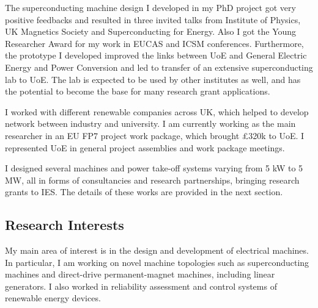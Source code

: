 \documentclass[a4paper,12pt]{article}
\begin{document}
The superconducting machine design I developed in my PhD project got very positive feedbacks and resulted in three invited talks from Institute of Physics, UK Magnetics Society and Superconducting for Energy. Also I got the Young Researcher Award for my work in EUCAS and ICSM conferences. Furthermore, the prototype I developed improved the links between UoE and General Electric Energy and Power Conversion and led to transfer of an extensive superconducting lab to UoE. The lab is expected to be used by other institutes as well, and has the potential to become the base for many research grant applications.

I worked with different renewable companies across UK, which helped to develop network between industry and university. I am currently working as the main researcher in an EU FP7 project work package, which brought £320k to UoE. I represented UoE in general project assemblies and work package meetings.

I designed several machines and power take-off systems varying from 5 kW to 5 MW, all in forms of consultancies and research partnerships, bringing research grants to IES. The details of these works are provided in the next section.

\clearpage
\subsection{Research Interests}

My main area of interest is in the design and development of electrical machines. In particular, I am working on novel machine topologies such as superconducting machines and direct-drive permanent-magnet machines, including linear generators. I also worked in reliability assessment and control systems of renewable energy devices.
\end{document}
